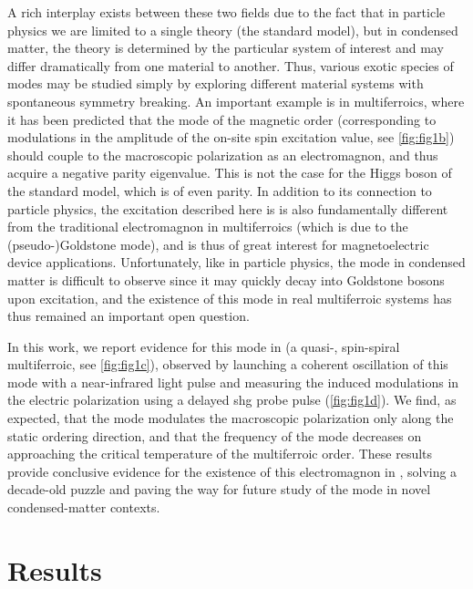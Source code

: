 A rich interplay exists between these two fields due to the fact that in particle physics we are limited to a single theory (the standard model), but in condensed matter, the theory is determined by the particular system of interest and may differ dramatically from one material to another.
Thus, various exotic species of \higgs modes may be studied simply by exploring different material systems with spontaneous symmetry breaking.
An important example is in multiferroics, where it has been predicted\citep{matsumoto_electromagnon_2014,matsumoto_electromagnon_2015} that the \higgs mode of the magnetic order (corresponding to modulations in the amplitude of the on-site spin excitation value, see \cref{fig:fig1b}) should couple to the macroscopic polarization as an electromagnon, and thus acquire a negative parity eigenvalue.
This is not the case for the Higgs boson of the standard model, which is of even parity\citep{atlas_collaboration_determination_2015}.
In addition to its connection to particle physics, the excitation described here is is also fundamentally different from the traditional electromagnon in multiferroics (which is due to the (pseudo-)Goldstone mode\citep{katsura_dynamical_2007}), and is thus of great interest for magnetoelectric device applications.
Unfortunately, like in particle physics, the \higgs mode in condensed matter is difficult to observe since it may quickly decay into Goldstone bosons upon excitation\cite{jain_higgs_2017}, and the existence of this mode in real multiferroic systems has thus remained an important open question.

In this work, we report evidence for this mode in  (a quasi-\oned, spin-spiral multiferroic, see \cref{fig:fig1c}), observed by launching a coherent oscillation of this mode with a near-infrared light pulse and measuring the induced modulations in the electric polarization using a delayed \gls{shg} probe pulse (\cref{fig:fig1d}).
We find, as expected, that the mode modulates the macroscopic polarization only along the static ordering direction, and that the frequency of the mode decreases on approaching the critical temperature of the multiferroic order.
These results provide conclusive evidence for the existence of this electromagnon in , solving a decade-old puzzle and paving the way for future study of the \higgs mode in novel condensed-matter contexts.

\section{Results}
